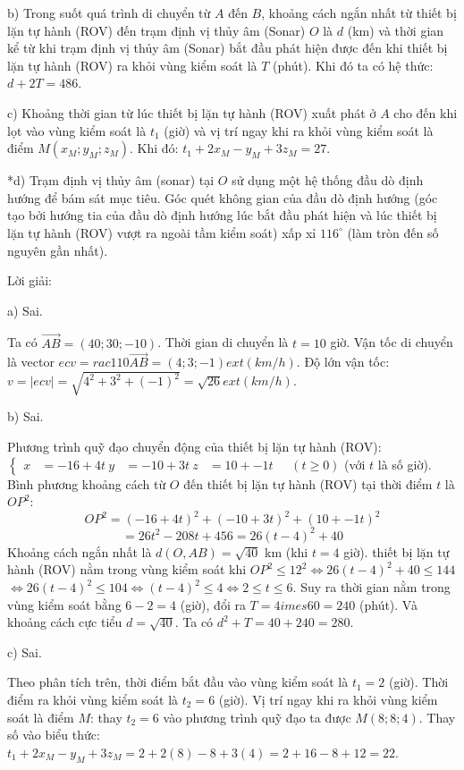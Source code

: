 \documentclass[a4paper,12pt]{article}
\newcommand{\heva}[1]{\left\{\begin{aligned}#1\end{aligned}\right.}
\begin{document}
b) Trong suốt quá trình di chuyển từ $A$ đến $B$, khoảng cách ngắn nhất từ thiết bị lặn tự hành (ROV) đến trạm định vị thủy âm (Sonar) $O$ là $d$ (km) và thời gian kể từ khi trạm định vị thủy âm (Sonar) bắt đầu phát hiện được đến khi thiết bị lặn tự hành (ROV) ra khỏi vùng kiểm soát là $T$ (phút). Khi đó ta có hệ thức: $d + 2T = 486$.

c) Khoảng thời gian từ lúc thiết bị lặn tự hành (ROV) xuất phát ở $A$ cho đến khi lọt vào vùng kiểm soát là $t_1$ (giờ) và vị trí ngay khi ra khỏi vùng kiểm soát là điểm $M(x_M; y_M; z_M)$. Khi đó: $t_1 + 2x_M - y_M + 3z_M = 27$.

*d) Trạm định vị thủy âm (sonar) tại $O$ sử dụng một hệ thống đầu dò định hướng để bám sát mục tiêu. Góc quét không gian của đầu dò định hướng (góc tạo bởi hướng tia của đầu dò định hướng lúc bắt đầu phát hiện và lúc thiết bị lặn tự hành (ROV) vượt ra ngoài tầm kiểm soát) xấp xỉ $116^{\circ}$ (làm tròn đến số nguyên gần nhất).

Lời giải:

a) Sai.

Ta có $\overrightarrow{AB} = (40; 30; -10) $. Thời gian di chuyển là $t = 10$ giờ.
Vận tốc di chuyển là vector $ec{v} = rac{1}{10} \overrightarrow{AB} = (4; 3; -1) 	ext{ (km/h)}$.
Độ lớn vận tốc: $v = |ec{v}| = \sqrt{4^2 + 3^2 + (-1)^2} = \sqrt{26} 	ext{ (km/h)}$.

b) Sai.

Phương trình quỹ đạo chuyển động của thiết bị lặn tự hành (ROV): $\heva{x &= -16 + 4t \ y &= -10 + 3t \ z &= 10 + -1t} \quad (t \ge 0)$ (với $t$ là số giờ).
Bình phương khoảng cách từ $O$ đến thiết bị lặn tự hành (ROV) tại thời điểm $t$ là $OP^2$:
$$OP^2 = (-16 + 4t)^2 + (-10 + 3t)^2 + (10 + -1t)^2$$
$$= 26t^2 - 208t + 456 = 26(t - 4)^2 + 40$$
Khoảng cách ngắn nhất là $d(O, AB) = \sqrt{40}$ km (khi $t = 4$ giờ).
thiết bị lặn tự hành (ROV) nằm trong vùng kiểm soát khi $OP^2 \le 12^2 \iff 26(t - 4)^2 + 40 \le 144$
$\iff 26(t - 4)^2 \le 104 \iff (t - 4)^2 \le 4 \iff 2 \le t \le 6$.
Suy ra thời gian nằm trong vùng kiểm soát bằng $6 - 2 = 4$ (giờ), đổi ra $T = 4 	imes 60 = 240$ (phút).
Và khoảng cách cực tiểu $d = \sqrt{40}$.
Ta có  $d^2 + T = 40 + 240 = 280$.

c) Sai.

Theo phân tích trên, thời điểm bắt đầu vào vùng kiểm soát là $t_1 = 2$ (giờ).
Thời điểm ra khỏi vùng kiểm soát là $t_2 = 6$ (giờ).
Vị trí ngay khi ra khỏi vùng kiểm soát là điểm $M$: thay $t_2 = 6$ vào phương trình quỹ đạo ta được $M(8; 8; 4)$.
Thay số vào biểu thức: $t_1 + 2x_M - y_M + 3z_M = 2 + 2(8) - 8 + 3(4) = 2 + 16 - 8 + 12 = 22$.
\end{document}
